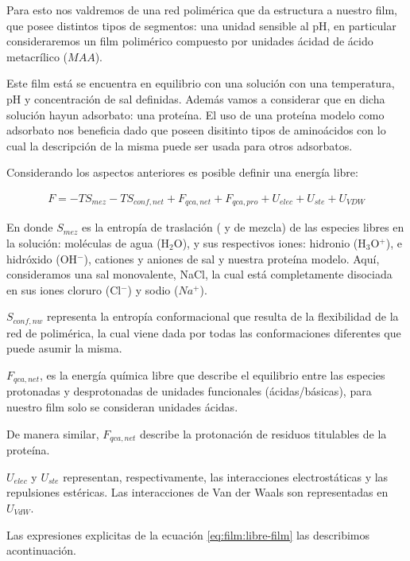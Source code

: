 Para esto nos valdremos de una  red polim\'erica que da estructura a nuestro film, que posee distintos tipos de segmentos: una unidad sensible al pH, en particular consideraremos un film polim\'erico compuesto por unidades \'acidad de \'acido metacr\'ilico ($MAA$).

Este film est\'a  se encuentra en equilibrio con una soluci\'on con una temperatura, pH y concentraci\'on de sal definidas. Adem\'as vamos a considerar que en dicha soluci\'on hayun adsorbato: una prote\'ina.
El uso de una prote\'ina modelo como adsorbato nos beneficia dado que poseen disitinto tipos de amino\'acidos con lo cual la descripci\'on de la misma puede ser usada para otros adsorbatos. 


Considerando los aspectos anteriores es posible definir una energ\'ia libre:

\begin{align}
 	F = -TS_{mez} -TS_{conf,net} + F_{qca,net} + F_{qca,pro} + U_{elec} + U_{ste} + U_{VDW}
 	\label{eq:film:libre-film}
\end{align}
 
\noindent En donde $S_{mez}$ es la entrop\'ia de traslaci\'on ( y de mezcla) de las especies libres en la soluci\'on: mol\'eculas de agua (H$_2$O), y sus respectivos iones:  hidronio (H$_3$O$^+$), e hidr\'oxido (OH$^- $), cationes y aniones de sal y nuestra prote\'ina modelo.
Aqu\'i, consideramos una sal monovalente, NaCl, la cual est\'a completamente disociada en sus  iones cloruro (Cl$^-$) y sodio ($Na^+$). 

$S_{conf,nw}$ representa la entrop\'ia conformacional que resulta de la flexibilidad de la red de polim\'erica, la cual viene dada por todas las conformaciones diferentes que puede asumir la misma.

$F_{qca,net}$, es la energ\'ia qu\'imica libre que describe el equilibrio entre las especies protonadas y desprotonadas de unidades funcionales (\'acidas/b\'asicas), para nuestro film solo se consideran unidades \'acidas.

De manera similar, $F_{qca,net}$ describe la protonaci\'on de residuos titulables de la prote\'ina.

$U_{elec}$ y $U_{ste}$ representan, respectivamente, las interacciones electrost\'aticas y las repulsiones est\'ericas.
Las interacciones de Van der Waals son representadas en $U_{VdW}$.


Las expresiones explicitas de la ecuaci\'on \ref{eq:film:libre-film} las describimos acontinuaci\'on.

